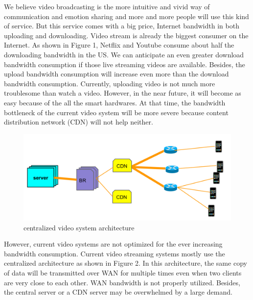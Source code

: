 \documentclass[letterpaper,twocolumn,10pt]{article}
\begin{document}
We believe video broadcasting is the more intuitive and vivid way of communication and emotion sharing and more and more people will use this kind of service. But this service comes with a big price, Internet bandwidth in both uploading and downloading. Video stream is already the biggest consumer on the Internet. As shown in Figure 1, Netflix and Youtube consume about half the downloading bandwidth in the US. We can anticipate an even greater download bandwidth consumption if those live streaming videos are available. Besides, the upload bandwidth consumption will increase even more than the download bandwidth consumption. Currently, uploading video is not much more troublesome than watch a video. However, in the near future, it will become as easy because of the all the smart hardwares. At that time, the bandwidth bottleneck of the current video system will be more severe because content distribution network (CDN) will not help neither. 



\begin{figure}[h]
\begin{center}
\includegraphics[scale=0.3]{pic/central_archi.png}
\end{center}
\caption{centralized video system architecture}
\end{figure}

However, current video systems are not optimized for the ever increasing bandwidth consumption. Current video streaming systems mostly use the centralized architecture as shown in Figure 2. In this architecture, the same copy of data will be transmitted over WAN for multiple times even when two clients are very close to each other. WAN bandwidth is not properly utilized. Besides, the central server or a CDN server may be overwhelmed by a large demand. 
\end{document}
